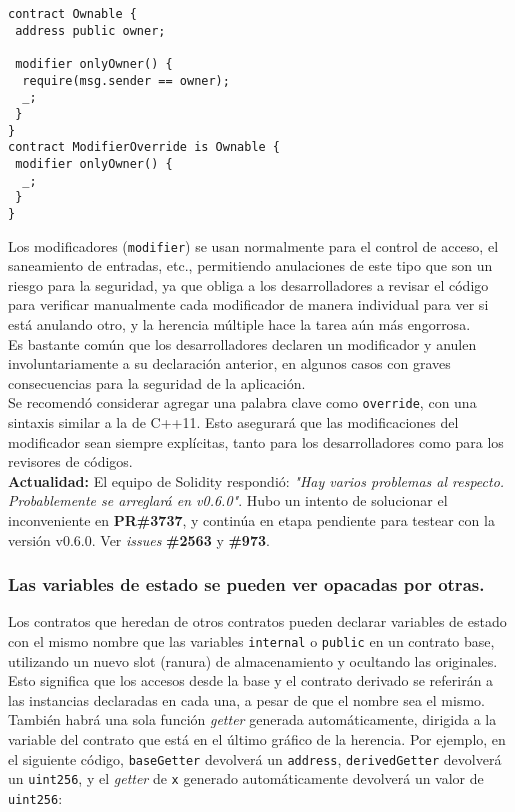 \begin{lstlisting}[language=Solidity]
contract Ownable {
 address public owner;
  
 modifier onlyOwner() {
  require(msg.sender == owner);
  _;
 }
}
contract ModifierOverride is Ownable { 
 modifier onlyOwner() {
  _;
 }
}
\end{lstlisting}

Los modificadores (\texttt{modifier}) se usan normalmente para el control de acceso, el saneamiento de entradas, etc., permitiendo anulaciones de este tipo que son un riesgo para la seguridad, ya que obliga a los desarrolladores a revisar el código para verificar manualmente cada modificador de manera individual para ver si está anulando otro, y la herencia múltiple hace la tarea aún más engorrosa.\\

Es bastante común que los desarrolladores declaren un modificador y anulen involuntariamente a su declaración anterior, en algunos casos con graves consecuencias para la seguridad de la aplicación.\\

Se recomendó considerar agregar una palabra clave como \texttt{override}, con una sintaxis similar a la de C++11\cite{CppReferenceOverride}. Esto asegurará que las modificaciones del modificador sean siempre explícitas, tanto para los desarrolladores como para los revisores de códigos.\\

\textbf{Actualidad:} El equipo de Solidity respondió: \textit{"Hay varios problemas al respecto. Probablemente se arreglará en v0.6.0"}. Hubo un intento de solucionar el inconveniente en \textbf{PR\#3737}\cite{GHPR3737}, y continúa en etapa pendiente para testear con la versión v0.6.0. Ver \textit{issues} \textbf{\#2563}\cite{GHI2563} y \textbf{\#973}\cite{GHI973}.\\

\subsubsection{Las variables de estado se pueden ver opacadas por otras.}

Los contratos que heredan de otros contratos pueden declarar variables de estado con el mismo nombre que las variables \texttt{internal} o \texttt{public} en un contrato base, utilizando un nuevo slot (ranura) de almacenamiento y ocultando las originales. Esto significa que los accesos desde la base y el contrato derivado se referirán a las instancias declaradas en cada una, a pesar de que el nombre sea el mismo. También habrá una sola función \textit{getter} generada automáticamente, dirigida a la variable del contrato que está en el último gráfico de la herencia. Por ejemplo, en el siguiente código, \texttt{baseGetter} devolverá un \texttt{address}, \texttt{derivedGetter} devolverá un \texttt{uint256}, y el \textit{getter} de \texttt{x} generado automáticamente devolverá un valor de \texttt{uint256}:

